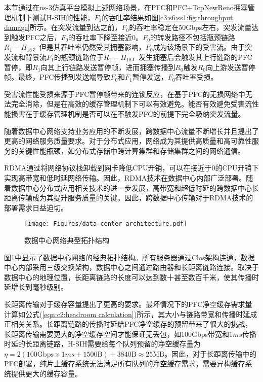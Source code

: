 本节通过在ns-3仿真平台模拟上述网络场景，在PFC和PFC+TcpNewReno拥塞管理机制下测试H-SIH的性能，$F_1$的吞吐率结果如图\ref{c3:s6:ss1:fig:throughput damage}所示。在突发流量到达之前，$F_0$的吞吐率稳定在50Gbps左右，突发流量达到触发PFC之后，$F_0$的吞吐率下降至接近0。$F_0$的转发路径不包括瓶颈链路$R_1-H_{18}$，但是其吞吐率仍然受其拥塞影响，$F_0$成为该场景下的受害流。由于突发流和背景流$F_1$的瓶颈链路位于$R_1-H_{18}$，发生拥塞后会触发其上行链路的PFC暂停，即$R_1$向其上行链路发送暂停帧，进而拥塞传播到$R_0$触发$R_0$向上游发送暂停帧。最终，PFC传播到发送端导致$F_0$和$F_1$暂停发送，$F_0$吞吐率受损。

受害流性能受损来源于PFC暂停帧带来的连锁反应，在基于PFC的无损网络中无法完全消除，但是在高效的缓存管理机制下可以有效避免。能否有效避免受害流性能损害在于缓存管理机制是否可以在不触发PFC的前提下完全吸纳突发流量。



随着数据中心网络支持业务应用的不断发展，跨数据中心流量不断增长并且提出了更高的网络服务质量要求\cite{zhao2023deterministic}。对于分布式应用，网络成为其提供高质量和高可靠性服务的关键性能瓶颈，如分布式存储中跨计算集群和存储集群之间的网络通信。

RDMA通过将网络协议栈卸载到网卡降低CPU开销，可以在接近于0的CPU开销下实现高带宽和低时延网络传输。因此，RDMA技术在数据中心内部广泛部署。随着数据中心分布式应用相关技术的进一步发展，高带宽和超低时延的跨数据中心长距离传输成为其提升服务质量的关键。因此，跨数据中心传输对于RDMA技术的部署需求日益迫切。

\begin{figure}[H]
  \centering
  \texttt{[image: Figures/data\_center\_architecture.pdf]}
  \caption{数据中心网络典型拓扑结构}
  \label{c4:s1:ss1:fig:data center typical topology}
\end{figure}

图\ref{c4:s1:ss1:fig:data center typical topology}中显示了数据中心网络的经典拓扑结构。所有服务器通过Clos架构连通，数据中心内部采用三级交换架构，数据中心之间通过路由器和长距离链路连接。取决于数据中心的地理位置，长距离链路的长度可以达到数十甚至数百千米，使其传播时延增长到毫秒级别\cite{bai2023empowering}。

长距离传输对于缓存容量提出了更高的要求。最坏情况下的PFC净空缓存需求量计算如公式(\ref{eqn:c2:headroom calculation})所示，其大小与链路带宽和传播时延成正相关关系。长距离链路的传播时延给PFC净空缓存的预留带来了很大的挑战，长距离传输需要更大的净空缓存空间才能保证无丢包，如100Gbps带宽和$1ms$传播时延的长距离链路，H-SIH需要给每个队列预留的净空缓存量为$\eta=2(100\text{Gbps} \times 1ms + 1500\text{B})+\text{3840B}\approx 25\text{MB}$。因此，对于长距离传输中的PFC部署，纯片上缓存系统无法满足所有队列的净空缓存需求，需要异构缓存系统提供更大的缓存容量。


